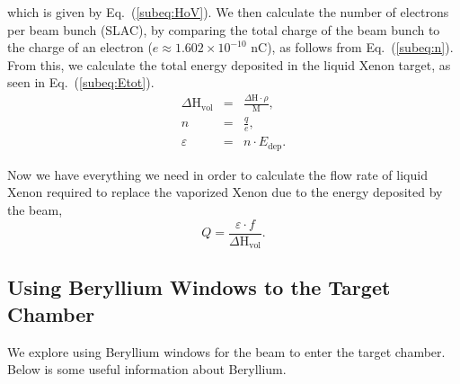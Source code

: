 \documentclass[%
reprint,
amsmath, amssymb,
aps,
floatfix,
]{revtex4-2}
\begin{document}
which is given by Eq.~(\ref{subeq:HoV}).
We then calculate the number of electrons per beam bunch (SLAC), by comparing the 
total charge of the beam bunch to the charge of an electron
($e \approx 1.602 \times 10^{-10}$ nC), as follows from Eq.~(\ref{subeq:n}).
From this, we calculate the total energy deposited in the liquid Xenon target, 
as seen in Eq.~(\ref{subeq:Etot}).
\begin{subequations}
    \begin{eqnarray}
        \Delta \textrm{H}_\textrm{vol} &=& \frac{\Delta \textrm{H}\cdot \rho}{\textrm{M}}, \label{subeq:HoV} \\
        n &=& \frac{q}{e}, \label{subeq:n} \\
        \varepsilon &=& n \cdot E_{\textrm{dep}} \label{subeq:Etot}.
    \end{eqnarray}
\end{subequations}
    
Now we have everything we need in order to calculate the flow rate of liquid Xenon
required to replace the vaporized Xenon due to the energy deposited by the beam,
\begin{equation}
    Q = \frac{\varepsilon \cdot f}{\Delta \textrm{H}_{\textrm{vol}}}.
\label{eq:Q}
\end{equation}

\subsection{Using Beryllium Windows to the Target Chamber}
We explore using Beryllium windows for the beam to enter the target chamber.
Below is some useful information about Beryllium.
\end{document}
